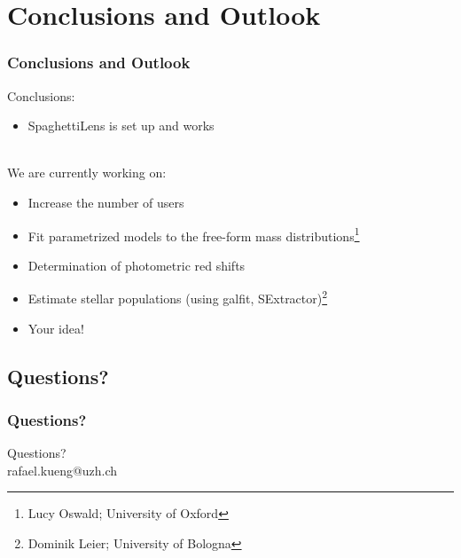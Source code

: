 \documentclass{beamer}
\begin{document}
%






\section{Conclusions and Outlook}

\begin{frame}
  \frametitle{Conclusions and Outlook}
	Conclusions:
  \begin{itemize}
		\item SpaghettiLens is set up and works
	\end{itemize}
	
	~\\
  
	We are currently working on:
  \begin{itemize}
		\item Increase the number of users
  	\item Fit parametrized models to the free-form mass distributions\footnote{Lucy Oswald; University of Oxford}
    \item Determination of photometric red shifts
    \item Estimate stellar populations (using galfit, SExtractor)\footnote{Dominik Leier; University of Bologna}
		\item Your idea!
  \end{itemize}
\end{frame}



\subsection*{Questions?}

\begin{frame}
  \frametitle{Questions?}
  Questions? \\
  rafael.kueng@uzh.ch
\end{frame}




%
\end{document}
